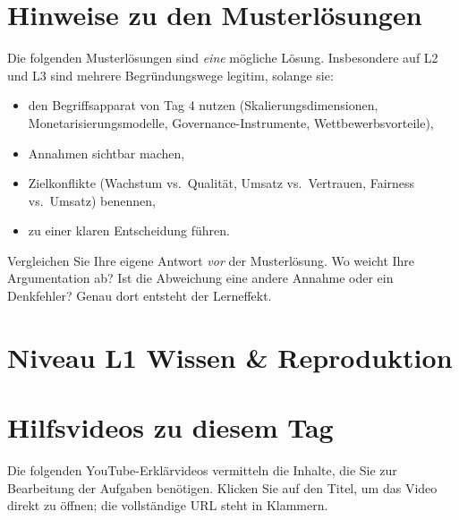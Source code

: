 \documentclass[11pt,a4paper,oneside]{article}
\begin{document}
\section*{Hinweise zu den Musterlösungen}
\thispagestyle{plain}

\noindent Die folgenden Musterlösungen sind \emph{eine} mögliche Lösung. Insbesondere auf L2 und L3 sind mehrere Begründungswege legitim, solange sie:

\begin{itemize}
  \item den Begriffsapparat von Tag 4 nutzen (Skalierungsdimensionen, Monetarisierungsmodelle, Governance-Instrumente, Wettbewerbsvorteile),
  \item Annahmen sichtbar machen,
  \item Zielkonflikte (Wachstum vs.\ Qualität, Umsatz vs.\ Vertrauen, Fairness vs.\ Umsatz) benennen,
  \item zu einer klaren Entscheidung führen.
\end{itemize}

\begin{infobox}
Vergleichen Sie Ihre eigene Antwort \emph{vor} der Musterlösung. Wo weicht Ihre Argumentation ab? Ist die Abweichung eine andere Annahme \textendash{} oder ein Denkfehler? Genau dort entsteht der Lerneffekt.
\end{infobox}

\clearpage

\section*{Niveau L1 \textendash{} Wissen \& Reproduktion}

\section*{Hilfsvideos zu diesem Tag}
\thispagestyle{plain}

\noindent Die folgenden YouTube-Erkl\"arvideos vermitteln die Inhalte, die Sie zur Bearbeitung der Aufgaben ben\"otigen. Klicken Sie auf den Titel, um das Video direkt zu \"offnen; die vollst\"andige URL steht in Klammern.
\end{document}

